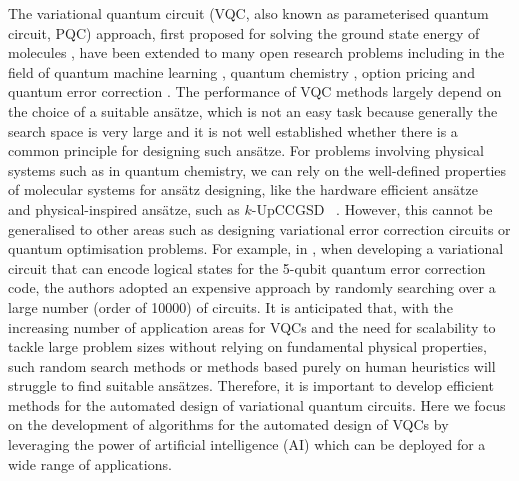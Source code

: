 \documentclass[a4paper,onecolumn,11pt]{quantumarticle}
\begin{document}
The variational quantum circuit (VQC, also known as parameterised quantum circuit, PQC) approach, first proposed for solving the ground state energy of molecules \cite{peruzzo2014variational}, have been extended to many open research problems including in the field of quantum machine learning \cite{schuldpetruccione2021}, quantum chemistry \cite{RevModPhys.92.015003}, option pricing \cite{2020optionpricing} and quantum error correction \cite{johnson2017qvector, Xu2021-dt}. The performance of VQC methods largely depend on the choice of a suitable ans\"atze, which is not an easy task because generally the search space is very large and it is not well established whether there is a common principle for designing such ans\"atze. For problems involving physical systems such as in quantum chemistry, we can rely on the well-defined properties of molecular systems for ans\"atz designing, like the  hardware efficient ans\"atze~\cite{2017hardwareefficientvqe} and physical-inspired ans\"atze, such as $k$-UpCCGSD~ \cite{physicalinspiredansatze1doi:10.1021/acs.jctc.8b01004}. However, this cannot be generalised to other areas such as designing variational error correction circuits or quantum optimisation problems. For example, in \cite{Xu2021-dt}, when developing a variational circuit that can encode logical states for the 5-qubit quantum error correction code, the authors adopted an expensive approach by randomly searching over a large number (order of 10000) of circuits. It is anticipated that, with the increasing number of application areas for VQCs and the need for scalability to tackle large problem sizes without relying on fundamental physical properties, such random search methods or methods based purely on human heuristics will struggle to find suitable ans\"atzes. Therefore, it is important to develop efficient methods for the automated design of variational quantum circuits. Here we focus on the development of algorithms for the automated design of VQCs by leveraging the power of artificial intelligence (AI) which can be deployed for a wide range of applications.







\end{document}
